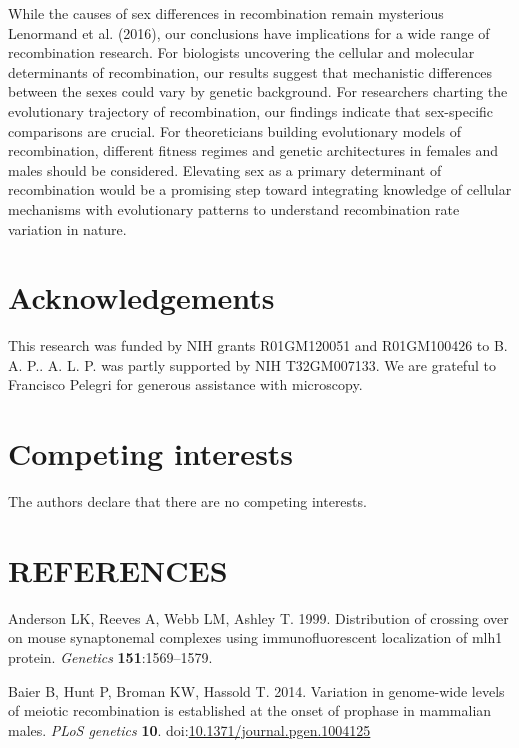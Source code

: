 \documentclass[
]{article}
\begin{document}
While the causes of sex differences in recombination remain mysterious
Lenormand et al. (2016), our conclusions have implications for a wide
range of recombination research. For biologists uncovering the cellular
and molecular determinants of recombination, our results suggest that
mechanistic differences between the sexes could vary by genetic
background. For researchers charting the evolutionary trajectory of
recombination, our findings indicate that sex-specific comparisons are
crucial. For theoreticians building evolutionary models of
recombination, different fitness regimes and genetic architectures in
females and males should be considered. Elevating sex as a primary
determinant of recombination would be a promising step toward
integrating knowledge of cellular mechanisms with evolutionary patterns
to understand recombination rate variation in nature.

\hypertarget{acknowledgements}{%
\section{Acknowledgements}\label{acknowledgements}}

This research was funded by NIH grants R01GM120051 and R01GM100426 to B.
A. P.. A. L. P. was partly supported by NIH T32GM007133. We are grateful
to Francisco Pelegri for generous assistance with microscopy.

\hypertarget{competing-interests}{%
\section{Competing interests}\label{competing-interests}}

The authors declare that there are no competing interests.

\hypertarget{references}{%
\section*{REFERENCES}\label{references}}

\hypertarget{refs}{}
\leavevmode\hypertarget{ref-anderson1999}{}%
Anderson LK, Reeves A, Webb LM, Ashley T. 1999. Distribution of crossing
over on mouse synaptonemal complexes using immunofluorescent
localization of mlh1 protein. \emph{Genetics} \textbf{151}:1569--1579.

\leavevmode\hypertarget{ref-baier2014}{}%
Baier B, Hunt P, Broman KW, Hassold T. 2014. Variation in genome-wide
levels of meiotic recombination is established at the onset of prophase
in mammalian males. \emph{PLoS genetics} \textbf{10}.
doi:\href{https://doi.org/10.1371/journal.pgen.1004125}{10.1371/journal.pgen.1004125}
\end{document}
